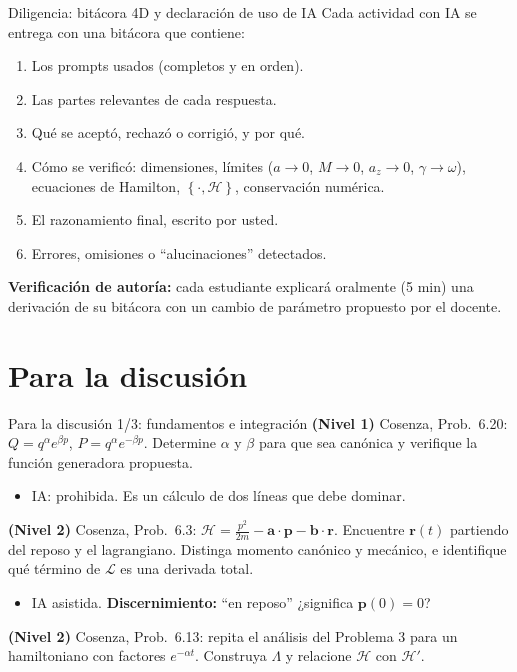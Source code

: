 \documentclass[spanish]{beamer}
\newcommand{\Lag}{\mathcal{L}}
\newcommand{\Ham}{\mathcal{H}}
\newcommand{\pb}[2]{\left\{#1,#2\right\}}   %
\begin{document}
\begin{frame}{Diligencia: bitácora 4D y declaración de uso de IA}
Cada actividad con IA se entrega con una bitácora que contiene:
\begin{enumerate}
  \item Los prompts usados (completos y en orden).
  \item Las partes relevantes de cada respuesta.
  \item Qué se aceptó, rechazó o corrigió, y por qué.
  \item Cómo se verificó: dimensiones, límites ($a\to 0$, $M\to 0$, $a_z\to 0$,
        $\gamma\to\omega$), ecuaciones de Hamilton, $\pb{\cdot}{\Ham}$,
        conservación numérica.
  \item El razonamiento final, escrito por usted.
  \item Errores, omisiones o ``alucinaciones'' detectados.
\end{enumerate}
\vspace{0.2cm}
\textbf{Verificación de autoría:} cada estudiante explicará oralmente (5 min) una
derivación de su bitácora con un cambio de parámetro propuesto por el docente.
\end{frame}

\section{Para la discusión}

\begin{frame}{Para la discusión 1/3: fundamentos e integración}
\textbf{(Nivel 1)} Cosenza, Prob.~6.20: $Q = q^{\alpha}e^{\beta p}$,
$P = q^{\alpha}e^{-\beta p}$. Determine $\alpha$ y $\beta$ para que sea canónica
y verifique la función generadora propuesta.
\begin{itemize}
  \item IA: prohibida. Es un cálculo de dos líneas que debe dominar.
\end{itemize}
\vspace{0.2cm}
\textbf{(Nivel 2)} Cosenza, Prob.~6.3: $\Ham = \frac{p^2}{2m} - \mathbf a\cdot\mathbf p - \mathbf b\cdot\mathbf r$.
Encuentre $\mathbf r(t)$ partiendo del reposo y el lagrangiano. Distinga momento
canónico y mecánico, e identifique qué término de $\Lag$ es una derivada total.
\begin{itemize}
  \item IA asistida. \textbf{Discernimiento:} ``en reposo'' ¿significa $\mathbf p(0)=0$?
\end{itemize}
\vspace{0.2cm}
\textbf{(Nivel 2)} Cosenza, Prob.~6.13: repita el análisis del Problema 3 para un
hamiltoniano con factores $e^{-\alpha t}$. Construya $\Lambda$ y relacione $\Ham$ con $\Ham'$.
\end{frame}
\end{document}
